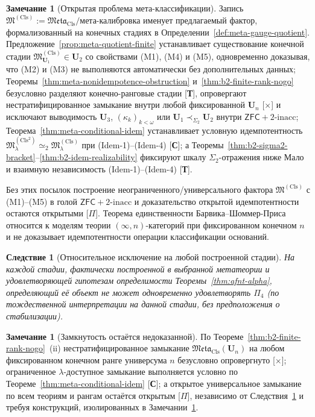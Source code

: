 \documentclass[11pt]{article}
\theoremstyle{plain}
\newtheorem{corollary}[theorem]{Следствие}
\theoremstyle{definition}
\newtheorem{remark}[theorem]{Замечание}
\newcommand{\fM}{\mathfrak{M}}
\newcommand{\Meta}{\mathfrak{Meta}}
\newcommand{\ZFC}{\mathsf{ZFC}}
\begin{document}
\begin{remark}[Открытая проблема мета-классификации]\label{thm:meta-stab}
Запись $\fM^{(\mathrm{Cls})} := \Meta_{\mathrm{Cls}} / \text{мета-калибровка}$ именует предлагаемый фактор, формализованный на конечных стадиях в Определении~\ref{def:meta-gauge-quotient}. Предложение~\ref{prop:meta-quotient-finite} устанавливает существование конечной стадии $\fM^{(\mathrm{Cls})}_{\mathbf{U}_1} \in \mathbf{U}_2$ со свойствами (M1), (M4) и (M5), одновременно доказывая, что (M2) и (M3) не выполняются автоматически без дополнительных данных; Теоремы~\ref{thm:meta-nonidempotence-obstruction} и~\ref{thm:b2-finite-rank-nogo} безусловно разделяют конечно-ранговые стадии \textup{[\textbf{Т}]}, опровергают нестратифицированное замыкание внутри любой фиксированной $\mathbf{U}_n$ \textup{[\textbf{$\times$}]} и исключают выводимость $\mathbf{U}_3$, $(\kappa_k)_{k < \omega}$ или $\mathbf{U}_1 \prec_{\Sigma_2} \mathbf{U}_2$ внутри $\ZFC + 2\text{-inacc}$; Теорема~\ref{thm:meta-conditional-idem} устанавливает условную идемпотентность $\fM^{(\mathrm{Cls}^2)}_\lambda \simeq_2 \fM^{(\mathrm{Cls})}_\lambda$ при (Idem-1)--(Idem-4) \textup{[\textbf{С}]}; а Теоремы~\ref{thm:b2-sigma2-bracket}--\ref{thm:b2-idem-realizability} фиксируют шкалу $\Sigma_2$-отражения ниже Мало и взаимную независимость (Idem-1)--(Idem-4) \textup{[\textbf{Т}]}.

Без этих посылок построение неограниченного/универсального фактора $\fM^{(\mathrm{Cls})}$ с (M1)--(M5) в голой $\ZFC + 2\text{-inacc}$ и доказательство открытой идемпотентности остаются открытыми \textup{[\textbf{$\Pi$}]}. Теорема единственности Барвика--Шоммер-Приса~\cite{BarwickSchommerPries2021} относится к моделям теории $(\infty, n)$-категорий при фиксированном конечном $n$ и не доказывает идемпотентности операции классификации оснований.
\end{remark}

\begin{corollary}[Относительное исключение на любой построенной стадии]\label{cor:iteration-closure}
На каждой стадии, фактически построенной в выбранной метатеории и удовлетворяющей гипотезам определимости Теоремы~\ref{thm:afnt-alpha}, определяющий её объект не может одновременно удовлетворять $\Pi_4$ (по тождественной интерпретации на данной стадии, без предположения о стабилизации).
\end{corollary}

\begin{remark}[Замкнутость остаётся недоказанной]\label{cor:meta-closure}
По Теореме~\ref{thm:b2-finite-rank-nogo}~(ii) нестратифицированное замыкание $\Meta_{\mathrm{Cls}}(\mathbf{U}_n)$ на любом фиксированном конечном ранге универсума $n$ безусловно опровергнуто \textup{[\textbf{$\times$}]}; ограниченное $\lambda$-доступное замыкание выполняется условно по Теореме~\ref{thm:meta-conditional-idem} \textup{[\textbf{С}]}; а открытое универсальное замыкание по всем теориям и рангам остаётся открытым \textup{[\textbf{$\Pi$}]}, независимо от Следствия~\ref{cor:iteration-closure} и требуя конструкций, изолированных в Замечании~\ref{thm:meta-stab}.
\end{remark}
\end{document}
